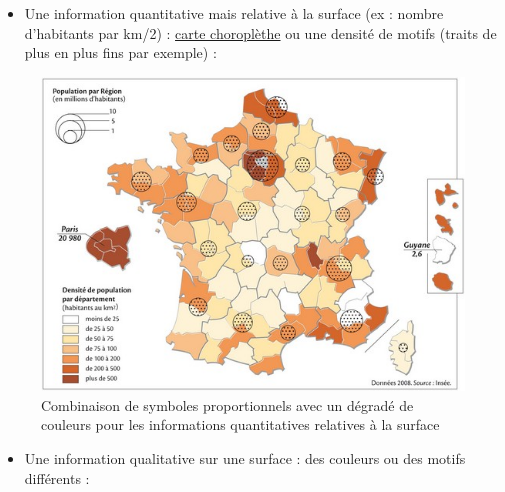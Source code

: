 \begin{itemize}
\tightlist
\item
  Une information quantitative mais relative à la surface (ex : nombre
  d'habitants par km/2) :
  \href{https://fr.wikipedia.org/wiki/Carte_choropl\%C3\%A8the}{carte
  choroplèthe} ou une densité de motifs (traits de plus en plus fins par
  exemple) :
\end{itemize}

\begin{figure}
\centering
\includegraphics{figures/example_proportion_and_cho.jpg}
\caption{Combinaison de symboles proportionnels avec un dégradé de
couleurs pour les informations quantitatives relatives à la surface}
\end{figure}

\begin{itemize}
\tightlist
\item
  Une information qualitative sur une surface : des couleurs ou des
  motifs différents :
\end{itemize}

